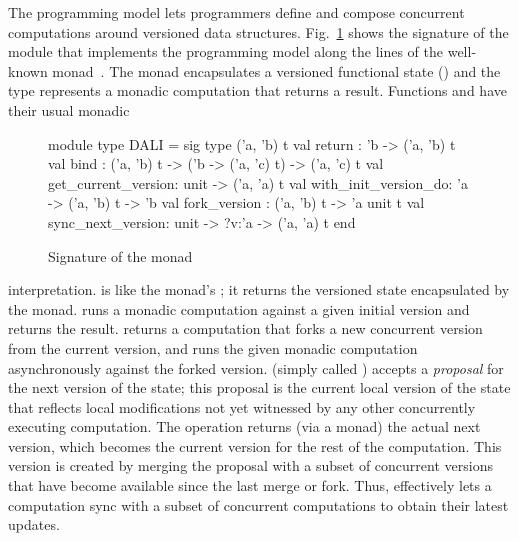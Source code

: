 The \name programming model lets programmers define and compose
concurrent computations around versioned data structures.
Fig.~\ref{fig:dali-monad} shows the signature of the \name module that
implements the programming model along the lines of the well-known
 monad~\cite{wadler-monad}. The monad encapsulates a
versioned functional state () and the type 
represents a monadic computation that returns a  result.
Functions  and  have their usual monadic
\begin{figure}
\begin{center}
  \begin{ocaml}
  module type DALI = sig
    type ('a, 'b) t
    val return : 'b -> ('a, 'b) t
    val bind : ('a, 'b) t -> ('b -> ('a, 'c) t) -> ('a, 'c) t
    val get_current_version: unit -> ('a, 'a) t
    val with_init_version_do: 'a -> ('a, 'b) t -> 'b
    val fork_version : ('a, 'b) t -> 'a unit t
    val sync_next_version: unit -> ?v:'a -> ('a, 'a) t
  end
  \end{ocaml}
  \caption{Signature of the \name monad}
  \label{fig:dali-monad}
\end{center}
\end{figure}
interpretation.  is like the 
monad's ; it returns the versioned state encapsulated by the
monad.  runs a monadic computation against
a given initial version and returns the result. 
returns a computation that forks a new concurrent version from the
current version, and runs the given monadic computation asynchronously
against the forked version.   (simply called
) accepts a \emph{proposal} for the next version of the state;
this proposal is the current local version of the state that reflects
local modifications not yet witnessed by any other concurrently
executing computation.  The operation returns (via a monad) the actual
next version, which becomes the current version for the rest of the
computation.  This version is created by merging the proposal with a
subset of concurrent versions that have become available since the
last merge or fork. Thus,  effectively lets a computation sync
with a subset of concurrent computations to obtain their latest
updates.

